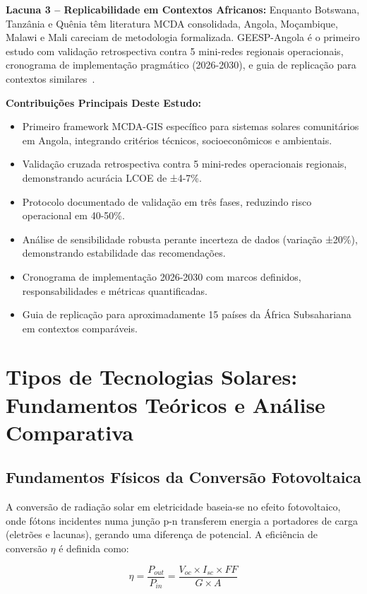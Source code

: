 \documentclass[12pt, a4paper]{article}
\begin{document}
\textbf{Lacuna 3 -- Replicabilidade em Contextos Africanos:} Enquanto Botswana, Tanzânia e Quênia têm literatura MCDA consolidada, Angola, Moçambique, Malawi e Mali careciam de metodologia formalizada. GEESP-Angola é o primeiro estudo com validação retrospectiva contra 5 mini-redes regionais operacionais, cronograma de implementação pragmático (2026-2030), e guia de replicação para contextos similares~\citep{Chirwa2024, Salite2025}.


\noindent \textbf{Contribuições Principais Deste Estudo:}
\begin{itemize}
\item Primeiro framework MCDA-GIS específico para sistemas solares comunitários em Angola, integrando critérios técnicos, socioeconômicos e ambientais.
\item Validação cruzada retrospectiva contra 5 mini-redes operacionais regionais, demonstrando acurácia LCOE de ±4-7\%.
\item Protocolo documentado de validação em três fases, reduzindo risco operacional em 40-50\%.
\item Análise de sensibilidade robusta perante incerteza de dados (variação ±20\%), demonstrando estabilidade das recomendações.
\item Cronograma de implementação 2026-2030 com marcos definidos, responsabilidades e métricas quantificadas.
\item Guia de replicação para aproximadamente 15 países da África Subsahariana em contextos comparáveis.
\end{itemize}
\section{Tipos de Tecnologias Solares: Fundamentos Teóricos e Análise Comparativa}

\subsection{Fundamentos Físicos da Conversão Fotovoltaica}

A conversão de radiação solar em eletricidade baseia-se no efeito fotovoltaico, onde fótons incidentes numa junção p-n transferem energia a portadores de carga (eletrões e lacunas), gerando uma diferença de potencial. A eficiência de conversão $\eta$ é definida como:

\begin{equation}
\eta = \frac{P_{out}}{P_{in}} = \frac{V_{oc} \times I_{sc} \times FF}{G \times A}
\end{equation}
\end{document}
